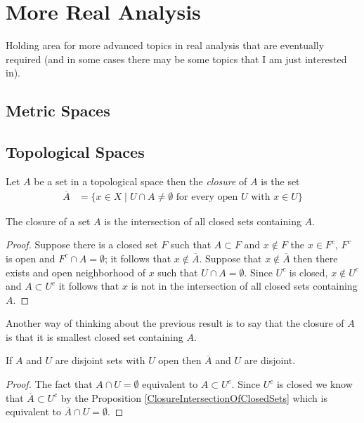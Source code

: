 \chapter{More Real Analysis}
Holding area for more advanced topics in real analysis that are
eventually required (and in some cases there may be some topics that I
am just interested in).
\section{Metric Spaces}

\section{Topological Spaces}

\begin{defn}Let $A$ be a set in a topological space then the \emph{closure} of $A$ is the set 
\begin{align*}
\overline{A} &= \lbrace x \in X \mid U \cap A \neq \emptyset \text{ for every open $U$ with $x \in U$} \rbrace
\end{align*}
\end{defn}

\begin{prop}\label{ClosureIntersectionOfClosedSets}The closure of a set $A$ is the intersection of all closed sets containing $A$.
\end{prop}
\begin{proof}
Suppose there is a closed set $F$ such that $A \subset F$ and $x \notin F$ the $x \in F^c$, $F^c$ is open and $F^c \cap A = \emptyset$; it follows that $x \notin \overline{A}$.  Suppose that
$x \notin \overline{A}$ then there exists and open neighborhood of $x$ such that $U \cap A = \emptyset$.  Since $U^c$ is closed, $x \notin U^c$ and $A \subset U^c$ it follows that $x$ is not in the 
intersection of all closed sets containing $A$.
\end{proof}
Another way of thinking about the previous result is to say that the closure of $A$ is that it is smallest closed set containing $A$.

\begin{cor}\label{DisjointOpenSetsDisjointClosure}If $A$ and $U$ are disjoint sets with $U$ open then $\overline{A}$ and $U$ are disjoint.
\end{cor}
\begin{proof}
The fact that $A \cap U = \emptyset$ equivalent to $A \subset U^c$.  Since $U^c$ is closed we know that $\overline{A} \subset U^c$ by the Proposition \ref{ClosureIntersectionOfClosedSets} which 
is equivalent to $\overline{A} \cap U = \emptyset$.
\end{proof}

